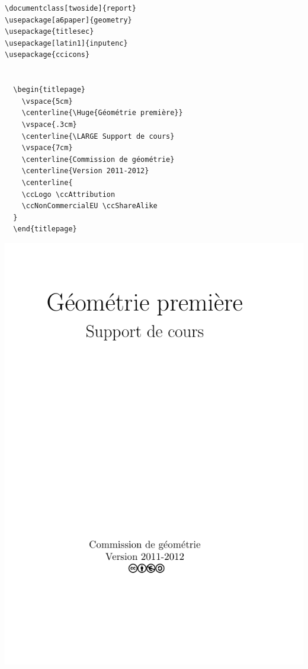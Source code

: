 \vspace{1em}
\begin{minipage}{.48\linewidth}
	\begin{verbatim}
\documentclass[twoside]{report}
\usepackage[a6paper]{geometry}
\usepackage{titlesec}
\usepackage[latin1]{inputenc}
\usepackage{ccicons}


  \begin{titlepage}
    \vspace{5cm}
    \centerline{\Huge{Géométrie première}}
    \vspace{.3cm}
    \centerline{\LARGE Support de cours}
    \vspace{7cm}
    \centerline{Commission de géométrie}
    \centerline{Version 2011-2012}
    \centerline{
    \ccLogo \ccAttribution
    \ccNonCommercialEU \ccShareAlike
  }
  \end{titlepage}

	\end{verbatim}
\end{minipage}
\hfill
\begin{boxedminipage}{.4\linewidth}
	\centering
	\includegraphics[scale=.5]{images/choix_extensions_exemple_titlePage}
\end{boxedminipage}
	
